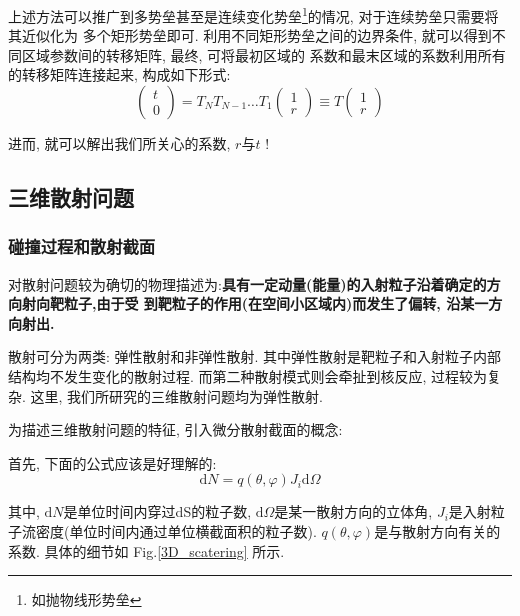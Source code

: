 \documentclass[a4paper, 11pt]{article}
\begin{document}
\begin{spacing}{1.2}
          上述方法可以推广到多势垒甚至是连续变化势垒\footnote{如抛物线形势垒}的情况, 对于连续势垒只需要将其近似化为
          多个矩形势垒即可. 利用不同矩形势垒之间的边界条件, 就可以得到不同区域参数间的转移矩阵, 最终, 可将最初区域的
          系数和最末区域的系数利用所有的转移矩阵连接起来, 构成如下形式:
          \begin{equation}
          \left(\begin{array}{c}t\\0\end{array} \right) = %
          T_N{}T_{N-1}\ldots{}T_1\left(\begin{array}{c}1\\r\end{array}\right) \equiv%
          T\left(\begin{array}{c}1\\r\end{array}\right)
          \end{equation} 

          进而, 就可以解出我们所关心的系数, $r$与$t$ !

      \subsection{三维散射问题}
        \subsubsection{碰撞过程和散射截面}
          对散射问题较为确切的物理描述为:\textbf{具有一定动量(能量)的入射粒子沿着确定的方向射向靶粒子,由于受
          到靶粒子的作用(在空间小区域内)而发生了偏转, 沿某一方向射出.}

          散射可分为两类: 弹性散射和非弹性散射. 其中弹性散射是靶粒子和入射粒子内部结构均不发生变化的散射过程. 
          而第二种散射模式则会牵扯到核反应, 过程较为复杂. 这里, 我们所研究的三维散射问题均为弹性散射. 

          为描述三维散射问题的特征, 引入微分散射截面的概念:
             
          首先, 下面的公式应该是好理解的:
          \begin{equation}
          \label{q_scattering}
            \mathrm{d}N = q(\theta, \varphi)J_i\mathrm{d}\Omega
          \end{equation}
          
          其中, $\mathrm{d}N$是单位时间内穿过dS的粒子数, $\mathrm{d}\Omega$是某一散射方向的立体角, 
          $J_i$是入射粒子流密度(单位时间内通过单位横截面积的粒子数). $q(\theta, \varphi)$是与散射方向有关的
          系数. 具体的细节如 Fig.\ref{3D_scatering} 所示.


\end{spacing}
\end{document}
